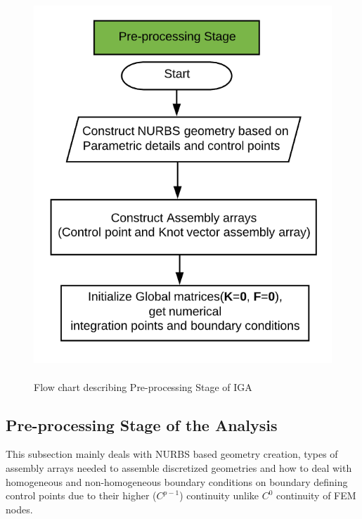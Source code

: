 \documentclass[11pt]{article}
\begin{document}
\begin{figure}[H]
	\begin{center}
		\includegraphics[scale=0.4]{PreProcessing.png} 
		\caption{\\Flow chart describing Pre-processing Stage of IGA}\label{PreProcessing}
	\end{center}
	
\end{figure}
\subsection{Pre-processing Stage of the Analysis}
This subsection mainly deals with NURBS based geometry creation, types of assembly arrays needed to assemble discretized geometries and how to deal with homogeneous and non-homogeneous boundary conditions on boundary defining control points due to their higher ($C^{p-1}$) continuity unlike $C^{0}$ continuity of FEM nodes.
\end{document}
